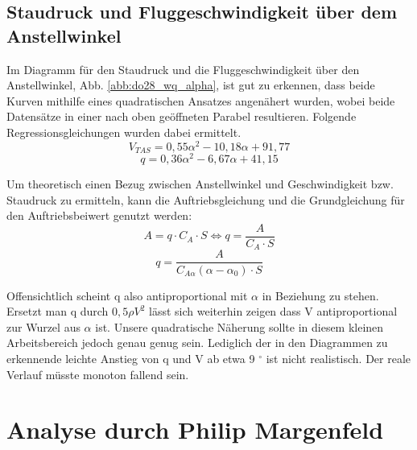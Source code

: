 \vspace{5mm}
\subsection{Staudruck und Fluggeschwindigkeit über dem Anstellwinkel}
Im Diagramm für den Staudruck und die Fluggeschwindigkeit über den Anstellwinkel, Abb. \ref{abb:do28_wq_alpha}, ist gut zu erkennen, dass beide Kurven mithilfe eines quadratischen Ansatzes angenähert wurden, wobei beide Datensätze in einer nach oben geöffneten Parabel resultieren. Folgende Regressionsgleichungen wurden dabei ermittelt.\\

\begin{equation*}
V_{TAS} = 0,55\alpha^2 - 10,18 \alpha + 91,77
\end{equation*}
\begin{equation*}
q = 0,36 \alpha^2 - 6,67 \alpha + 41,15
\end{equation*}

\vspace{5mm} \noindent
Um theoretisch einen Bezug zwischen Anstellwinkel und Geschwindigkeit bzw. Staudruck zu ermitteln, kann die Auftriebsgleichung und die Grundgleichung für den Auftriebsbeiwert genutzt werden:\\

\begin{equation}
A = q \cdot C_A \cdot S \Leftrightarrow q = \frac{A}{C_A \cdot S}
\end{equation}
\begin{equation*}
q = \frac{A}{C_{A\alpha}(\alpha-\alpha_0) \cdot S}
\end{equation*}

\vspace{5mm} \noindent
Offensichtlich scheint q also antiproportional mit $\alpha$ in Beziehung zu stehen. Ersetzt man q durch $0,5\rho V^2$ lässt sich weiterhin zeigen dass V antiproportional zur Wurzel aus $\alpha$ ist. Unsere quadratische Näherung sollte in diesem kleinen Arbeitsbereich jedoch genau genug sein. Lediglich der in den Diagrammen zu erkennende leichte Anstieg von q und V ab etwa 9 $^\circ$ ist nicht realistisch. Der reale Verlauf müsste monoton fallend sein.



\newpage

\section{Analyse durch Philip Margenfeld}
